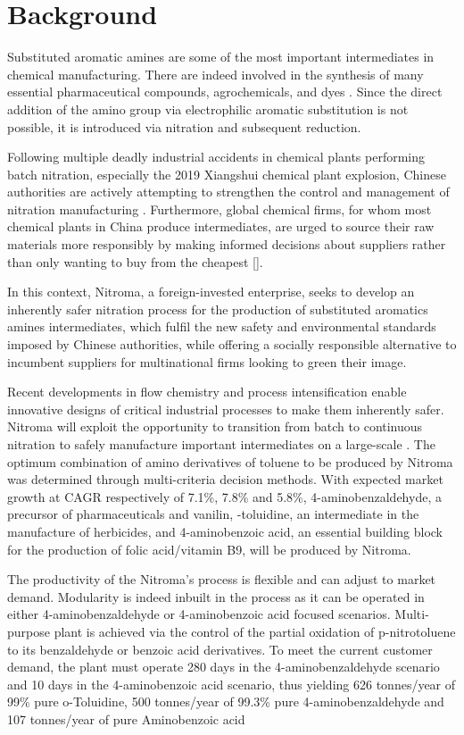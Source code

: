 \section{Background}

Substituted aromatic amines are some of the most important intermediates in chemical manufacturing. There are indeed involved in the synthesis of many essential pharmaceutical compounds, agrochemicals, and dyes \cite{vogt_amines_2000}. Since the direct addition of the amino group via electrophilic aromatic substitution is not possible, it is introduced via nitration and subsequent reduction. 

Following multiple deadly industrial accidents in chemical plants performing batch nitration, especially the 2019 Xiangshui chemical plant explosion, Chinese authorities are actively attempting to strengthen the control and management of nitration manufacturing \cite{el_diario_china_2019}. Furthermore, global chemical firms, for whom most chemical plants in China produce intermediates, are urged to source their raw materials more responsibly by making informed decisions about suppliers rather than only wanting to buy from the cheapest [].

In this context, Nitroma, a foreign-invested enterprise, seeks to develop an inherently safer nitration process for the production of substituted aromatics amines intermediates, which fulfil the new safety and environmental standards imposed by Chinese authorities, while offering a socially responsible alternative to incumbent suppliers for multinational firms looking to green their image. 

Recent developments in flow chemistry and process intensification enable innovative designs of critical industrial processes to make them inherently safer. Nitroma will exploit the opportunity to transition  from batch to continuous nitration to safely manufacture important intermediates on a large-scale \cite{di_miceli_raimondi_safety_2015}. The optimum combination of amino derivatives of toluene to be produced by Nitroma was determined through multi-criteria decision methods.
With expected market growth at CAGR respectively of 7.1\%, 7.8\% and 5.8\%, 4-aminobenzaldehyde, a precursor of pharmaceuticals and vanilin, \ortho-toluidine, an intermediate in the manufacture of herbicides, and 4-aminobenzoic acid, an essential building block for the production of folic acid/vitamin B9, will be produced by Nitroma. 

The productivity of the Nitroma's process is flexible and can adjust to market demand. Modularity is indeed inbuilt in the process as it can be operated in either 4-aminobenzaldehyde or 4-aminobenzoic acid focused scenarios. Multi-purpose plant is achieved via the control of the partial oxidation of p-nitrotoluene to its benzaldehyde or benzoic acid derivatives. To meet the current customer demand, the plant must operate 280 days in the 4-aminobenzaldehyde scenario and 10 days in the 4-aminobenzoic acid scenario, thus yielding 626 tonnes/year of 99\% pure o-Toluidine, 500 tonnes/year of 99.3\% pure 4-aminobenzaldehyde and 107 tonnes/year of pure Aminobenzoic acid





